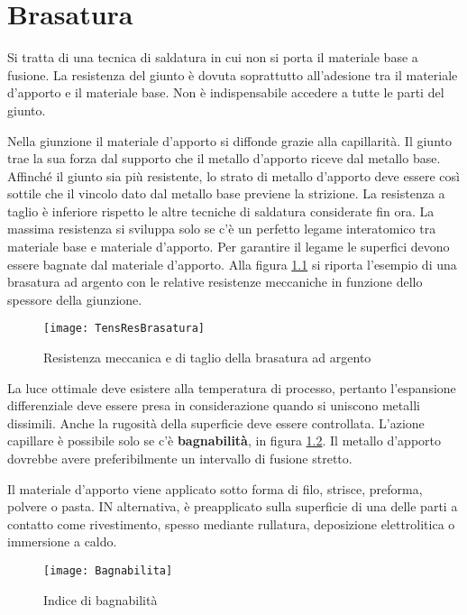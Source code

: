 \chapter{Brasatura}\label{chp:Brasatura}
Si tratta di una tecnica di saldatura in cui non si porta il materiale base a fusione. La resistenza del giunto è dovuta soprattutto all'adesione tra il materiale d'apporto e il materiale base.
Non è indispensabile accedere a tutte le parti del giunto.

Nella giunzione il materiale d'apporto si diffonde grazie alla capillarità.
Il giunto trae la sua forza dal supporto che il metallo d'apporto riceve dal metallo base.
Affinché il giunto sia più resistente, lo strato di metallo d'apporto deve essere così sottile che il vincolo dato dal metallo base previene la strizione.
La resistenza a taglio è inferiore rispetto le altre tecniche di saldatura considerate fin ora.
La massima resistenza si sviluppa solo se c'è un perfetto legame interatomico tra materiale base e materiale d'apporto.
Per garantire il legame le superfici devono essere bagnate dal materiale d'apporto.
Alla figura \ref{fig:TensResBrasatura} si riporta l'esempio di una brasatura ad argento con le relative resistenze meccaniche in funzione dello spessore della giunzione.

\begin{figure}
\centering
\texttt{[image: TensResBrasatura]}
\caption{Resistenza meccanica e di taglio della brasatura ad argento}
\label{fig:TensResBrasatura}
\end{figure}

La luce ottimale deve esistere alla temperatura di processo, pertanto l'espansione differenziale deve essere presa in considerazione quando si uniscono metalli dissimili.
Anche la rugosità della superficie deve essere controllata.
L'azione capillare è possibile solo se c'è \textbf{bagnabilità}, in figura \ref{fig:Bagnabilita}.
Il metallo d'apporto dovrebbe avere preferibilmente un intervallo di fusione stretto.

Il materiale d'apporto viene applicato sotto forma di filo, strisce, preforma, polvere o pasta.
IN alternativa, è preapplicato sulla superficie di una delle parti a contatto come rivestimento, spesso mediante rullatura, deposizione elettrolitica o immersione a caldo.

\begin{figure}
\centering
\texttt{[image: Bagnabilita]}
\caption{Indice di bagnabilità}
\label{fig:Bagnabilita}
\end{figure}

